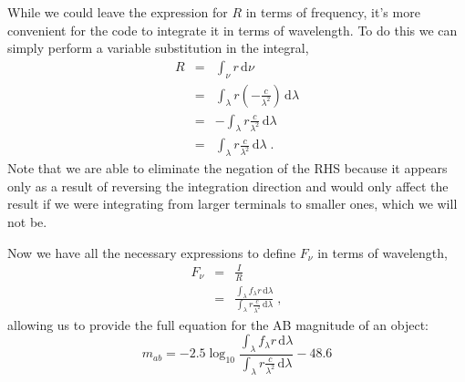 \documentclass[12pt]{scrartcl}
\newcommand{\dx}[1]{\ensuremath{\,\mathrm{d}#1}}
\begin{document}
While we could leave the expression for $R$ in terms of
frequency, it's more convenient for the code to integrate it in
terms of wavelength. To do this we can simply perform a variable
substitution in the integral,
\begin{eqnarray*}
R & = & \int_\nu r \dx{\nu} \\
& = & \int_\lambda r \left(-\frac{c}{\lambda^2}\right) \dx{\lambda} \\
& = & -\int_\lambda r \frac{c}{\lambda^2} \dx{\lambda} \\
& = & \int_\lambda r \frac{c}{\lambda^2} \dx{\lambda} \; .
\end{eqnarray*}
Note that we are able to eliminate the negation of the RHS because
it appears only as a result of reversing the integration direction and
would only affect the result if we were integrating from larger terminals
to smaller ones, which we will not be.

Now we have all the necessary expressions to define $F_\nu$ in terms
of wavelength,
\begin{eqnarray*}
F_\nu & = & \frac{I}{R} \\
& = & \frac{{\displaystyle \int_\lambda f_\lambda r \dx{\lambda}}}{{\displaystyle \int_\lambda r \frac{c}{\lambda^2} \dx{\lambda}}} \; ,
\end{eqnarray*}
allowing us to provide the full equation for the AB magnitude of an
object:
\[ m_{ab} = -2.5\log_{10} \frac{{\displaystyle \int_\lambda f_\lambda r \dx{\lambda}}}{{\displaystyle \int_\lambda r \frac{c}{\lambda^2} \dx{\lambda}}} - 48.6 \]
\end{document}
